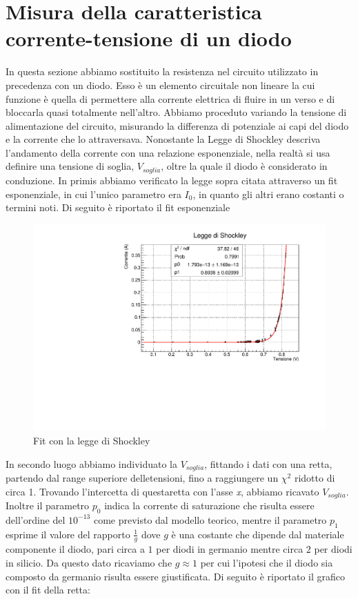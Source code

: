 \section{Misura della caratteristica corrente-tensione di un diodo}
In questa sezione abbiamo sostituito la resistenza nel circuito utilizzato in precedenza con un diodo. Esso è un elemento circuitale non lineare la cui funzione è quella di permettere alla corrente elettrica di fluire in un verso e di bloccarla quasi totalmente nell'altro.
Abbiamo proceduto variando la tensione di alimentazione del circuito, misurando la differenza di potenziale ai capi del diodo e la corrente che lo attraversava.
Nonostante la Legge di Shockley descriva l'andamento della corrente con una relazione esponenziale, nella realtà si usa definire una tensione di soglia, $V_{soglia}$, oltre la quale il diodo è considerato in conduzione.
In primis abbiamo verificato la legge sopra citata attraverso un fit esponenziale, in cui l'unico parametro era $I_{0}$, in quanto gli altri erano costanti o termini noti.
Di seguito è riportato il fit esponenziale

\begin{figure}[H]
    \centering
    \includegraphics[scale=.5]{Immagini/diodo2.pdf}
    \caption{Fit con la legge di Shockley}
\end{figure}
In secondo luogo abbiamo individuato la $V_{soglia}$, fittando i dati con una retta, partendo dal range superiore delletensioni, fino a raggiungere un $\chi ^{2}$ ridotto di circa 1. Trovando l'intercetta di questaretta con l'asse \textit{x}, abbiamo ricavato $V_{soglia}$. Inoltre il parametro $p_0$ indica la corrente di saturazione che risulta essere dell'ordine del $10^{-13}$ come previsto dal modello teorico, mentre il parametro $p_1$ esprime il valore del rapporto $\frac{1}{g}$ dove $g$ è una costante che dipende dal materiale componente il diodo, pari circa a $1$ per diodi in germanio mentre circa $2$ per diodi in silicio. Da questo dato ricaviamo che $g\approx 1$ per cui l'ipotesi che il diodo sia composto da germanio risulta essere giustificata.
Di seguito è riportato il grafico con il fit della retta:


